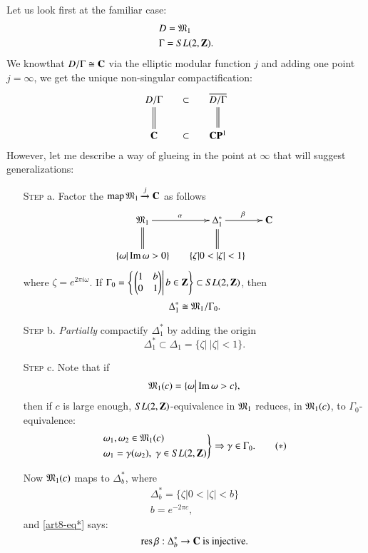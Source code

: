\section{}\label{art8-sec1}
Let us look first at the familiar case:
\begin{align*}
& D = \mathfrak{M}_1\\
&\Gamma = S L (2, \mathbf{Z}).
\end{align*}
We know\pageoriginale that $D / \Gamma \cong \mathbf{C}$ via the elliptic modular function $j$ and adding one point $j = \infty$, we get the unique non-singular compactification:
$$
\xymatrix@R=0.7cm@C=0.5cm{
D/ \Gamma \ar@{=}[d] & \subset & \overline{D / \Gamma} \ar@{=}[d]\\
\bC & \subset & \bC \bP^1
}
$$
However, let me describe a way of glueing in the point at $\infty$ that will suggest generalizations:
\begin{itemize}
\item[\textsc{Step} a.] Factor the $\operatorname{map} \mathfrak{M}_1 \xrightarrow{j} \mathbf{C}$ as follows
$$ 
\xymatrix@R=0.7cm@C=0.5cm{
\fM_1 \ar@{=}[d] \ar[r]^{\alpha} & \Delta^\ast_1 \ar@{=}[d] \ar[r]^{\beta}& \bC\\
\{\omega | \Iim \omega > 0 \} & \{\zeta | 0 < |\zeta| < 1 \} & 
}
$$
where $\zeta = e^{2\pi i \omega}$. If $\Gamma_0 = \left\{ \left.\begin{pmatrix}1&b\\0 & 1\end{pmatrix} \right| b \in \mathbf{Z} \right\}  \subset S L (2, \mathbf{Z})$, then
$$
\Delta^\ast_1 \cong \mathfrak{M}_1 / \Gamma_0.
$$

\item[\textsc{Step} b.] \textit{Partially} compactify $\Delta^\ast_1$ by adding the origin
$$
\Delta^\ast_1 \subset \Delta_1 = \{\zeta \big|~ |\zeta| < 1\}. 
$$

\item[\textsc{Step} c.] Note that if 
$$
\mathfrak{M}_1 (c) = \{\omega \big| \operatorname{Im} \omega > c\},
$$
then if $c$ is large enough, $SL(2, \mathbf{Z})$-equivalence in $\mathfrak{M}_1$ reduces, in $\mathfrak{M}_1(c)$, to $\Gamma_0$-equivalence:
\begin{equation*}
\left.
\begin{aligned}
&\omega_1, \omega_2 \in \mathfrak{M}_1 (c) \\
&\omega_1 = \gamma (\omega_2), \; \gamma \in S L (2 , \mathbf{Z})
\end{aligned}
\right\} 
\Rightarrow \gamma \in \Gamma_0.
\tag{$\ast$}\label{art8-eq*}
\end{equation*}

Now $\mathfrak{M}_1 (c)$ maps to $\Delta^\ast_b$, where 
\begin{gather*}
\Delta^\ast_b = \{\zeta \big| 0< |\zeta| < b\}\\
b = e^{-2 \pi c},
\end{gather*}
and \eqref{art8-eq*} says:
$$
\operatorname{res} \beta : \Delta^\ast_b \to \mathbf{C} \text{ is injective.}
$$


\end{itemize}
